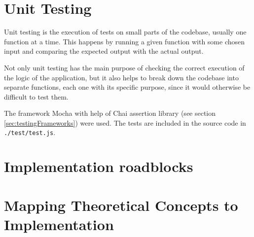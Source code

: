 \section{Unit Testing}
Unit testing is the execution of tests on small parts of the codebase, usually one function at a time. This happens by running a given function with some chosen input and comparing the expected output with the actual output. 

Not only unit testing has the main purpose of checking the correct execution of the logic of the application, but it also helps to break down the codebase into separate functions, each one with its specific purpose, since it would otherwise be difficult to test them.

The framework Mocha with help of Chai assertion library (see section \ref{sec:testingFrameworks}) were used. The tests are included in the source code in \lstinline{./test/test.js}.

\section{Implementation roadblocks}


\section{Mapping Theoretical Concepts to Implementation}